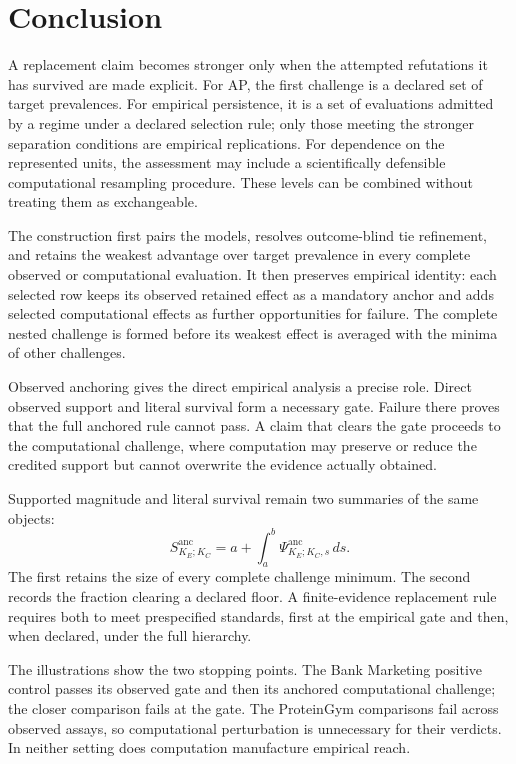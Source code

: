 \documentclass[11pt]{article}
\newcommand{\Sanc}{S^{\mathrm{anc}}}
\newcommand{\Psianc}{\Psi^{\mathrm{anc}}}
\theoremstyle{remark}
\begin{document}
\section{Conclusion}

A replacement claim becomes stronger only when the attempted refutations it
has survived are made explicit. For AP, the first challenge is a declared set
of target prevalences. For empirical persistence, it is a set of evaluations
admitted by a regime under a declared selection rule; only those meeting the
stronger separation conditions are empirical replications. For dependence on
the represented units, the assessment may include a scientifically defensible
computational resampling procedure. These levels can be combined without
treating them as exchangeable.

The construction first pairs the models, resolves outcome-blind tie refinement,
and retains the weakest advantage over target prevalence in every complete
observed or computational evaluation. It then preserves empirical identity:
each selected row keeps its observed retained effect as a mandatory anchor and
adds selected computational effects as further opportunities for failure. The
complete nested challenge is formed before its weakest effect is averaged with
the minima of other challenges.

Observed anchoring gives the direct empirical analysis a precise role. Direct
observed support and literal survival form a necessary gate. Failure there
proves that the full anchored rule cannot pass. A claim that clears the gate
proceeds to the computational challenge, where computation may preserve or
reduce the credited support but cannot overwrite the evidence actually
obtained.

Supported magnitude and literal survival remain two summaries of the same
objects:
\[
\Sanc_{K_E;K_C}
=
a+\int_a^b\Psianc_{K_E;K_C,s}\,ds.
\]
The first retains the size of every complete challenge minimum. The second
records the fraction clearing a declared floor. A finite-evidence replacement
rule requires both to meet prespecified standards, first at the empirical gate
and then, when declared, under the full hierarchy.

The illustrations show the two stopping points. The Bank Marketing positive
control passes its observed gate and then its anchored computational challenge;
the closer comparison fails at the gate. The ProteinGym comparisons fail
across observed assays, so computational perturbation is unnecessary for their
verdicts. In neither setting does computation manufacture empirical reach.
\end{document}
